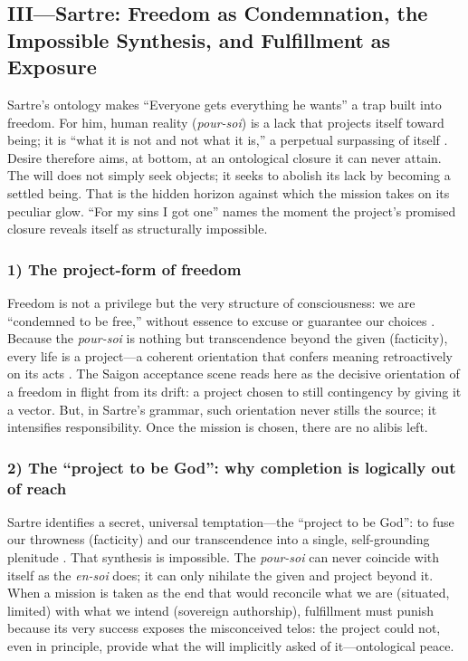 \subsection*{III—Sartre: Freedom as Condemnation, the Impossible Synthesis, and Fulfillment as
	Exposure}
\label{ssec:iii-sartre}
Sartre's ontology makes ``Everyone gets everything he wants'' a trap built into freedom. For
him, human reality (\emph{pour-soi}) is a lack that projects itself toward being; it is ``what
it is not and not what it is,'' a perpetual surpassing of itself
\parencite[pp.~100--110]{SartreBN2003}. Desire therefore aims, at bottom, at an ontological
closure it can never attain. The will does not simply seek objects; it seeks to abolish its
lack by becoming a settled being. That is the hidden horizon against which the mission takes on
its peculiar glow. ``For my sins I got one'' names the moment the project's promised closure
reveals itself as structurally impossible.

\subsubsection*{1) The project-form of freedom}

Freedom is not a privilege but the very structure of consciousness: we are ``condemned to be
free,'' without essence to excuse or guarantee our choices \parencite[pp.~34--36]{SartreBN2003}.
Because the \emph{pour-soi} is nothing but transcendence beyond the given (facticity), every
life is a project—a coherent orientation that confers meaning retroactively on its acts
\parencite[pp.~561--569]{SartreBN2003}. The Saigon acceptance scene reads here as the decisive
orientation of a freedom in flight from its drift: a project chosen to still contingency by
giving it a vector. But, in Sartre's grammar, such orientation never stills the source; it
intensifies responsibility. Once the mission is chosen, there are no alibis left.

\subsubsection*{2) The ``project to be God'': why completion is logically out of reach}

Sartre identifies a secret, universal temptation—the ``project to be God'': to fuse our
throwness (facticity) and our transcendence into a single, self-grounding plenitude
\parencite[pp.~586--604]{SartreBN2003}. That synthesis is impossible. The \emph{pour-soi} can
never coincide with itself as the \emph{en-soi} does; it can only nihilate the given and
project beyond it. When a mission is taken as the end that would reconcile what we are
(situated, limited) with what we intend (sovereign authorship), fulfillment must punish because
its very success exposes the misconceived telos: the project could not, even in principle,
provide what the will implicitly asked of it—ontological peace.


